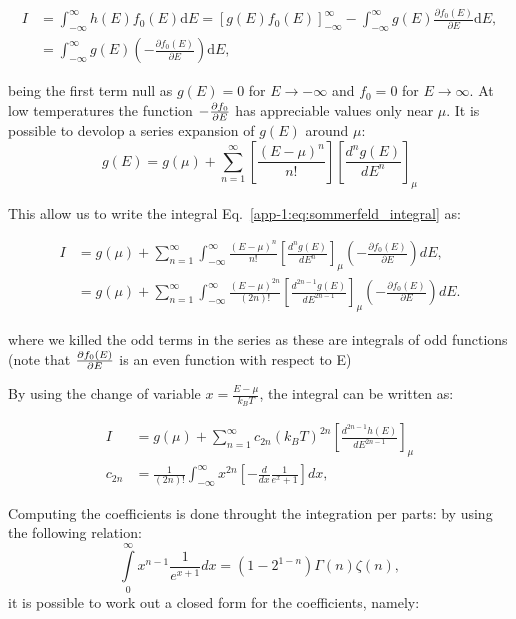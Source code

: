 \begin{align}
  I & =\int_{-\infty}^{\infty} h(E) f_{0}(E) \text{d} E=\left[g(E) f_{0}(E)\right]_{-\infty}^{\infty}-\int_{-\infty}^{\infty} g(E) \frac{\partial f_{0}(E)}{\partial E} \text{d} E, \nonumber \\
    & =\int_{-\infty}^{\infty} g(E)\left(-\frac{\partial f_{0}(E)}{\partial E}\right) \text{d}E,
\end{align}

being the first term null as $g(E) = 0 $ for $E\longrightarrow -\infty$ and $f_0 = 0$ for $E\longrightarrow\infty$. At low temperatures the function $-\pdv{f_0}{E}$ has appreciable values only near $\mu$. It is possible to devolop a series expansion of $g(E)$ around $\mu$:
\begin{equation}
  g(E)=g(\mu)+\sum_{n=1}^{\infty}\left[\frac{(E-\mu)^{n}}{n !}\right]\left[\frac{d^{n} g(E)}{d E^{n}}\right]_{\mu}
\end{equation}

This allow us to write the integral Eq.~\ref{app-1:eq:sommerfeld_integral} as:

\begin{align}
  I & =g(\mu)+\sum_{n=1}^{\infty} \int_{-\infty}^{\infty} \frac{(E-\mu)^{n}}{n !}\left[\frac{d^{n} g(E)}{d E^{n}}\right]_{\mu}\left(-\frac{\partial f_{0}(E)}{\partial E}\right) d E \nonumber,     \\
    & =g(\mu)+\sum_{n=1}^{\infty} \int_{-\infty}^{\infty} \frac{(E-\mu)^{2 n}}{(2 n) !}\left[\frac{d^{2 n-1} g(E)}{d E^{2 n-1}}\right]_{\mu}\left(-\frac{\partial f_{0}(E)}{\partial E}\right) d E.
\end{align}

where we killed the odd terms in the series as these are integrals of odd functions (note that $\pdv{f_0(E)}{E}$ is an even function with respect to E)

By using the change of variable $x = \frac{E-\mu}{k_BT}$, the integral can be written as:

\begin{align}
  I       & =g(\mu)+\sum_{n=1}^{\infty} c_{2 n}\left(k_{B} T\right)^{2 n}\left[\frac{d^{2 n-1} h(E)}{d E^{2 n-1}}\right]_{\mu}                            \\
  c_{2 n} & =\frac{1}{(2 n) !} \int_{-\infty}^{\infty} x^{2 n}\left[-\frac{d}{d x} \frac{1}{e^{x}+1}\right] d x \label{app-1:eq:coefficients_sommerfeld},
\end{align}

Computing the coefficients is done throught the integration per parts: by using the following relation:
\begin{equation}
  \int\limits_{0}^{\infty} x^{n-1} \frac{1}{e^{x+1}} d x=\left(1-2^{1-n}\right) \Gamma(n) \zeta(n),
\end{equation}
it is possible to work out a closed form for the coefficients, namely:

